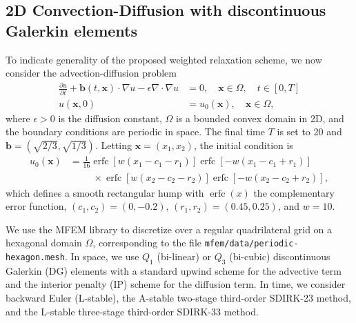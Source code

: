 \documentclass[VANCOUVER,STIX1COL]{WileyNJD-v2}
\begin{document}
\subsection{2D Convection-Diffusion with discontinuous Galerkin elements}
\label{sec:2Dresults}

To indicate generality of the proposed weighted relaxation scheme, we now consider the advection-diffusion 
problem 
\begin{align}
   \label{eqn:adv-diff}
   \frac{\partial u}{\partial t} + \mathbf{b}(t,\mathbf{x})\cdot \nabla u - \epsilon \nabla \cdot \nabla u & = 0, \quad \mathbf{x} \in \Omega, \quad t \in [0,T] \\
      u(\mathbf{x},0) &= u_0(\mathbf{x}),\quad  \mathbf{x} \in \Omega,
\end{align}
where $\epsilon > 0$ is the diffusion constant, $\Omega$ is a bounded convex domain in  2D, and the
boundary conditions are periodic in space. The final time $T$ is set to 20 and
$\mathbf{b}=(\sqrt{2/3},\sqrt{1/3})$.  Letting $\mathbf{x}=(x_1,x_2)$, the initial condition is 
\begin{align*}
u_0(\mathbf{x})
  &= \frac{1}{16}
  \operatorname{erfc}[w (x_1-c_1-r_1)] \operatorname{erfc}[-w (x_1-c_1+r_1)] \\
  &\phantom{= \frac{1}{16}} ~\times
  \operatorname{erfc}[w (x_2-c_2-r_2)] \operatorname{erfc}[-w (x_2-c_2+r_2)],
\end{align*}
which defines a smooth rectangular hump with $\operatorname{erfc}(x)$ the complementary error function, 
$(c_1,c_2)=(0,-0.2)$, $(r_1,r_2)=(0.45,0.25)$, and $w=10$.  


We use the MFEM library \cite{mfem} to discretize over a regular quadrilateral
grid on a hexagonal domain $\Omega$, corresponding to the file
\texttt{mfem/data/periodic-hexagon.mesh}.  In space, we use $Q_1$ (bi-linear)
or $Q_3$ (bi-cubic) discontinuous Galerkin (DG) elements with a standard upwind
scheme for the advective term and the interior penalty (IP) \cite{ArBrCoMa2002}
scheme for the diffusion term.  In time, we consider backward Euler (L-stable), 
the A-stable two-stage third-order SDIRK-23 method, 
and the L-stable three-stage third-order SDIRK-33 
method.  

\end{document}
